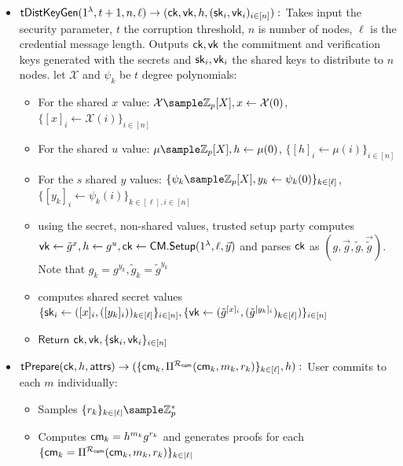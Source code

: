 \begin{itemize}
    \item $\mathsf{tDistKeyGen}(1^{\lambda}, t+1, n, \ell) \to (\mathsf{ck}, \mathsf{vk}, h, (\mathsf{sk}_i, \mathsf{vk}_i)_{i \in [n]}):$ Takes input the security parameter, $t$ the corruption threshold, $n$ is number of nodes, $\ell$ is the credential message length. Outputs $\mathsf{ck}, \mathsf{vk}$ the commitment and verification keys generated with the secrets and $\mathsf{sk}_i, \mathsf{vk}_i$ the shared keys to distribute to $n$ nodes. let $\mathcal{X}$ and $\psi_k $ be $t$ degree polynomials:
    \begin{itemize}
        \item For the shared $x$ value: $\mathcal{X} \sample \Z_p[X], x \gets \mathcal{X}(0)$, $\{[x]_i \gets \mathcal{X}(i)\}_{i\in [n]}$
        \item For the shared $u$ value: $\mu \sample \Z_p[X], h \gets \mu(0)$, $\{[h]_i \gets \mu(i)\}_{i\in [n]}$
        \item For the $s$ shared $y$ values: $\{\psi_k \sample \Z_p[X], y_k \gets \psi_k(0)\}_{k \in [\ell]}$, $\{[y_k]_i \gets \psi_k(i)\}_{k \in [\ell], i \in [n]}$
        \item using the secret, non-shared values, trusted setup party computes $\mathsf{vk} \gets \tilde{g}^x, h \gets g^u, \mathsf{ck} \gets \mathsf{CM.Setup}(1^{\lambda}, \ell, \vec{y})$ and parses $\mathsf{ck}$ as $(g, \vec{g}, \tilde{g}, \vec{\tilde{g}})$. Note that $g_k = g^{y_k}, \tilde{g}_k = \tilde{g}^{y_k}$
        \item computes shared secret values $\{\mathsf{sk}_i \gets ([x]_i, ([y_k]_i))_{k\in[\ell]}\}_{i \in [n]}, \{\mathsf{vk} \gets (\tilde{g}^{[x]_i}, (\tilde{g}^{[y_k]_i})_{k\in[\ell]})\}_{i \in [n]}$
        \item $\mathsf{Return } $ $ \mathsf{ck}, \mathsf{vk}, \{\mathsf{sk}_i, \mathsf{vk}_i\}_{i \in [n]}$
    \end{itemize}

    \item $\mathsf{tPrepare}(\mathsf{ck}, h, \mathsf{attrs}) \to (\{\mathsf{cm}_k, \Pi^{\mathcal{R}_{\mathsf{com}}}(\mathsf{cm}_k, m_k, r_k)\}_{k \in [\ell]}, h):$ User commits to each $m$ individually: 
    \begin{itemize}
        \item Samples $\{r_k\}_{k \in |\ell|} \sample \Z_p^*$
        \item Computes $\mathsf{cm}_k = h^{m_k}g^{r_k}$ and generates proofs for each $\{\mathsf{cm}_k = \Pi^{\mathcal{R}_{\mathsf{com}}}(\mathsf{cm}_k, m_k, r_k)\}_{k \in |\ell|}$
    \end{itemize}


\end{itemize}

